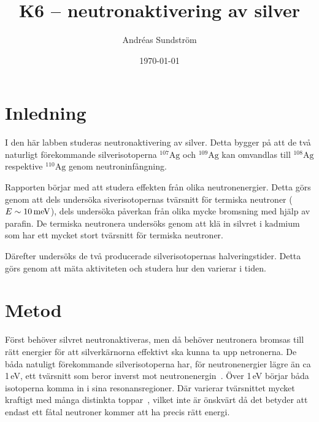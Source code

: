 \documentclass[11pt,a4paper, english, swedish
]{article}
\begin{document}

\title{K6 -- neutronaktivering av silver}
\author{Andréas Sundström}
\date{\today}

\maketitle



\section{Inledning}
I den här labben studeras neutronaktivering av silver. Detta bygger på att de två naturligt förekommande silverisotoperna $^{107}\text{Ag}$ och $^{109}\text{Ag}$ kan omvandlas till $^{108}\text{Ag}$ respektive $^{110}\text{Ag}$ genom neutroninfångning.

Rapporten börjar med att studera effekten från olika neutronenergier. Detta görs genom att dels undersöka siverisotopernas tvärsnitt för termiska neutroner ($E\sim \unit[10]{meV}$), dels undersöka påverkan från olika mycke bromsning med hjälp av parafin. De termiska neutronera undersöks genom att klä in silvret i kadmium som har ett mycket stort tvärsnitt för termiska neutroner. 

Därefter undersöks de två producerade silverisotopernas halveringstider. Detta görs genom att mäta aktiviteten och studera hur den varierar i tiden.

\section{Metod}
Först behöver silvret neutronaktiveras, men då behöver neutronera bromsas till rätt energier för att silverkärnorna effektivt ska kunna ta upp netronerna. De båda natuligt förekommande silverisotoperna har, för neutronenergier lägre än ca 1\,eV, ett tvärsnitt som beror inverst mot neutronenergin~\cite{labPM}. Över 1\,eV börjar båda isotoperna komma in i sina resonansregioner. Där varierar tvärsnittet mycket kraftigt med många distinkta toppar~\cite{labPM}, vilket inte är önskvärt då det betyder att endast ett fåtal neutroner kommer att ha precis rätt energi.
\end{document}

